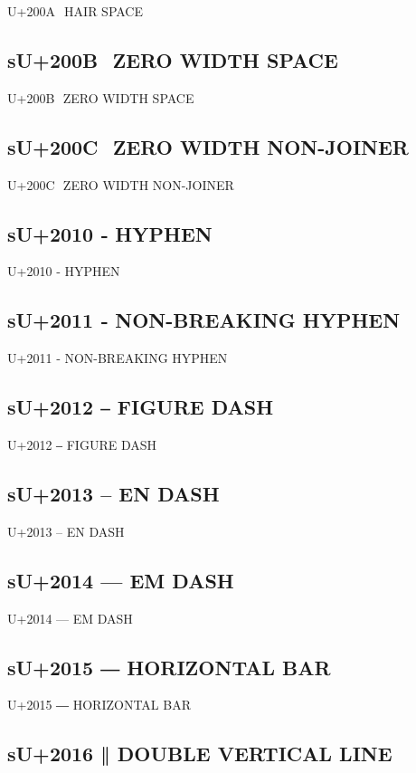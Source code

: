 U+200A   HAIR SPACE

\subsection{sU+200B ​ ZERO WIDTH SPACE}

U+200B ​ ZERO WIDTH SPACE

\subsection{sU+200C   ‌ ZERO WIDTH NON-JOINER}

U+200C   ‌ ZERO WIDTH NON-JOINER

\subsection{sU+2010 ‐  HYPHEN}

U+2010 ‐  HYPHEN

\subsection{sU+2011 ‑  NON-BREAKING HYPHEN}

U+2011 ‑  NON-BREAKING HYPHEN

\subsection{sU+2012 ‒  FIGURE DASH}

U+2012 ‒  FIGURE DASH

\subsection{sU+2013 –  EN DASH}

U+2013 –  EN DASH

\subsection{sU+2014 —  EM DASH}

U+2014 —  EM DASH

\subsection{sU+2015 ―  HORIZONTAL BAR}

U+2015 ―  HORIZONTAL BAR

\subsection{sU+2016 ‖  DOUBLE VERTICAL LINE}

